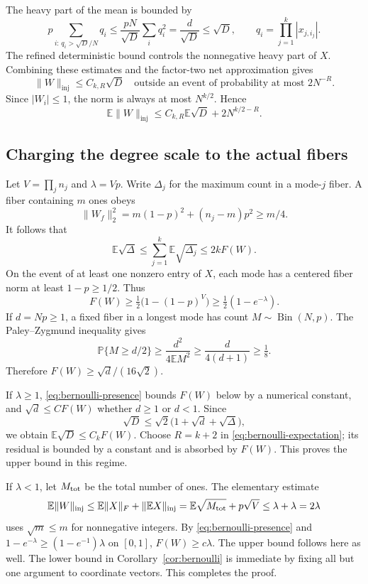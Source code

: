 \documentclass[11pt]{article}
\theoremstyle{spaced}
\theoremstyle{remark}
\numberwithin{equation}{section}
\newcommand{\E}{\mathbb E}
\newcommand{\Pp}{\mathbb P}
\newcommand{\inj}{\mathrm{inj}}
\begin{document}
The heavy part of the mean is bounded by
\[
 p\sum_{i:\,q_i>\sqrt D/N}q_i
 \leq\frac{pN}{\sqrt D}\sum_i q_i^2
 =\frac d{\sqrt D}\leq\sqrt D,
 \qquad q_i=\prod_{j=1}^k|x_{j,i_j}|.
\]
The refined deterministic bound controls the nonnegative heavy part of $X$. Combining these estimates and the factor-two net approximation gives
\begin{equation}\label{eq:bernoulli-hp}
 \|W\|_{\inj}\leq C_{k,R}\sqrt D
 \quad\text{outside an event of probability at most }2N^{-R}.
\end{equation}
Since $|W_i|\leq1$, the norm is always at most $N^{k/2}$. Hence
\begin{equation}\label{eq:bernoulli-expectation}
 \E\|W\|_{\inj}
 \leq C_{k,R}\E\sqrt D+2N^{k/2-R}.
\end{equation}

\subsection{Charging the degree scale to the actual fibers}
Let $V=\prod_jn_j$ and $\lambda=Vp$. Write $\Delta_j$ for the maximum count in a mode-$j$ fiber. A fiber containing $m$ ones obeys
\[
 \|W_f\|_2^2=m(1-p)^2+(n_j-m)p^2\geq m/4.
\]
It follows that
\[
 \E\sqrt\Delta\leq\sum_{j=1}^k\E\sqrt{\Delta_j}\leq2kF(W).
\]
On the event of at least one nonzero entry of $X$, each mode has a centered fiber norm at least $1-p\geq1/2$. Thus
\begin{equation}\label{eq:bernoulli-presence}
 F(W)\geq\tfrac12\bigl(1-(1-p)^V\bigr)
 \geq\tfrac12(1-e^{-\lambda}).
\end{equation}
If $d=Np\geq1$, a fixed fiber in a longest mode has count $M\sim\operatorname{Bin}(N,p)$. The Paley--Zygmund inequality gives
\[
 \Pp\{M\geq d/2\}\geq\frac{d^2}{4\E M^2}
 \geq\frac{d}{4(d+1)}\geq\tfrac18.
\]
Therefore $F(W)\geq\sqrt d/(16\sqrt2)$.

If $\lambda\geq1$, \eqref{eq:bernoulli-presence} bounds $F(W)$ below by a numerical constant, and $\sqrt d\leq C F(W)$ whether $d\geq1$ or $d<1$. Since
\[
 \sqrt D\leq\sqrt2\bigl(1+\sqrt d+\sqrt\Delta\bigr),
\]
we obtain $\E\sqrt D\leq C_kF(W)$. Choose $R=k+2$ in \eqref{eq:bernoulli-expectation}; its residual is bounded by a constant and is absorbed by $F(W)$. This proves the upper bound in this regime.

If $\lambda<1$, let $M_{\rm tot}$ be the total number of ones. The elementary estimate
\[
 \E\|W\|_{\inj}
 \leq\E\|X\|_F+\|\E X\|_{\inj}
 =\E\sqrt{M_{\rm tot}}+p\sqrt V
 \leq\lambda+\lambda=2\lambda
\]
uses $\sqrt m\leq m$ for nonnegative integers. By \eqref{eq:bernoulli-presence} and
$1-e^{-\lambda}\geq(1-e^{-1})\lambda$ on $[0,1]$, $F(W)\geq c\lambda$. The upper bound follows here as well. The lower bound in Corollary~\ref{cor:bernoulli} is immediate by fixing all but one argument to coordinate vectors. This completes the proof.
\end{document}
